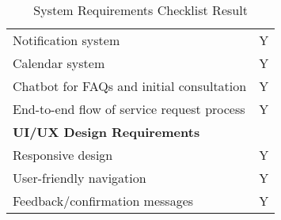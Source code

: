 \begin{table}[ht]
\begin{tabular}{|p{10cm}|c|}
		Notification system & Y \\
		Calendar system & Y \\
		Chatbot for FAQs and initial consultation & Y \\
		End-to-end flow of service request process & Y \\
		\hline
		\multicolumn{2}{|l|}{\textbf{UI/UX Design Requirements}} \\
		\hline
		Responsive design & Y \\
		User-friendly navigation & Y \\
		Feedback/confirmation messages & Y \\
		\hline
	\end{tabular}
	\caption{System Requirements Checklist Result}
	\label{tab:summary_results}
\end{table}